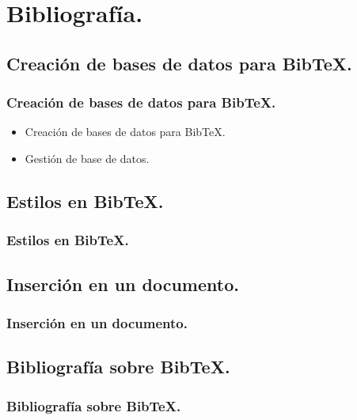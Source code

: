 \documentclass{beamer}
\begin{document}
\section{Bibliografía.}

\subsection{Creación de bases de datos para BibTeX.}
\begin{frame}
  \frametitle{Creación de bases de datos para BibTeX.}
   \begin{itemize}
   \item<1->{Creación de bases de datos para BibTeX.}
   \item<2->{Gestión de base de datos.}
  \end{itemize}
\end{frame}

\subsection{Estilos en BibTeX.}
\begin{frame}
  \frametitle{Estilos en BibTeX.}
\end{frame}

\subsection{Inserción en un documento.}
\begin{frame}
  \frametitle{Inserción en un documento.}
\end{frame}

\subsection{Bibliografía sobre BibTeX.}
\begin{frame}
  \frametitle{Bibliografía sobre BibTeX.}
\end{frame}
\end{document}
